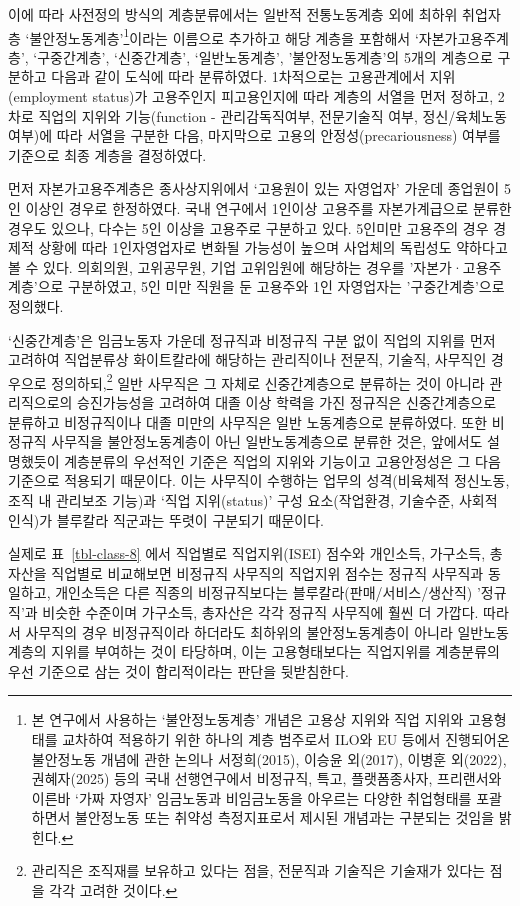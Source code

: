 \documentclass[
  letterpaper,
  DIV=11,
  numbers=noendperiod]{scrartcl}
\begin{document}
이에 따라 사전정의 방식의 계층분류에서는 일반적 전통노동계층 외에 최하위
취업자층 `불안정노동계층'\footnote{본 연구에서 사용하는 `불안정노동계층'
  개념은 고용상 지위와 직업 지위와 고용형태를 교차하여 적용하기 위한
  하나의 계층 범주로서 ILO와 EU 등에서 진행되어온 불안정노동 개념에 관한
  논의나 서정희(2015), 이승윤 외(2017), 이병훈 외(2022), 권혜자(2025)
  등의 국내 선행연구에서 비정규직, 특고, 플랫폼종사자, 프리랜서와 이른바
  `가짜 자영자' 임금노동과 비임금노동을 아우르는 다양한 취업형태를
  포괄하면서 불안정노동 또는 취약성 측정지표로서 제시된 개념과는
  구분되는 것임을 밝힌다.}이라는 이름으로 추가하고 해당 계층을 포함해서
`자본가고용주계층', `구중간계층', `신중간계층', `일반노동계층',
'불안정노동계층'의 5개의 계층으로 구분하고 다음과 같이 도식에 따라
분류하였다. 1차적으로는 고용관계에서 지위(employment status)가
고용주인지 피고용인지에 따라 계층의 서열을 먼저 정하고, 2차로 직업의
지위와 기능(function - 관리감독직여부, 전문기술직 여부, 정신/육체노동
여부)에 따라 서열을 구분한 다음, 마지막으로 고용의
안정성(precariousness) 여부를 기준으로 최종 계층을 결정하였다.

먼저 자본가고용주계층은 종사상지위에서 `고용원이 있는 자영업자' 가운데
종업원이 5인 이상인 경우로 한정하였다. 국내 연구에서 1인이상 고용주를
자본가계급으로 분류한 경우도 있으나, 다수는 5인 이상을 고용주로 구분하고
있다. 5인미만 고용주의 경우 경제적 상황에 따라 1인자영업자로 변화될
가능성이 높으며 사업체의 독립성도 약하다고 볼 수 있다. 의회의원,
고위공무원, 기업 고위임원에 해당하는 경우를 '자본가·고용주계층'으로
구분하였고, 5인 미만 직원을 둔 고용주와 1인 자영업자는 '구중간계층'으로
정의했다.

`신중간계층'은 임금노동자 가운데 정규직과 비정규직 구분 없이 직업의
지위를 먼저 고려하여 직업분류상 화이트칼라에 해당하는 관리직이나 전문직,
기술직, 사무직인 경우으로 정의하되,\footnote{관리직은 조직재를 보유하고
  있다는 점을, 전문직과 기술직은 기술재가 있다는 점을 각각 고려한
  것이다.} 일반 사무직은 그 자체로 신중간계층으로 분류하는 것이 아니라
관리직으로의 승진가능성을 고려하여 대졸 이상 학력을 가진 정규직은
신중간계층으로 분류하고 비정규직이나 대졸 미만의 사무직은 일반
노동계층으로 분류하였다. 또한 비정규직 사무직을 불안정노동계층이 아닌
일반노동계층으로 분류한 것은, 앞에서도 설명했듯이 계층분류의 우선적인
기준은 직업의 지위와 기능이고 고용안정성은 그 다음 기준으로 적용되기
때문이다. 이는 사무직이 수행하는 업무의 성격(비육체적 정신노동, 조직 내
관리보조 기능)과 `직업 지위(status)' 구성 요소(작업환경, 기술수준,
사회적 인식)가 블루칼라 직군과는 뚜렷이 구분되기 때문이다.

실제로 표~\ref{tbl-class-8} 에서 직업별로 직업지위(ISEI) 점수와
개인소득, 가구소득, 총자산을 직업별로 비교해보면 비정규직 사무직의
직업지위 점수는 정규직 사무직과 동일하고, 개인소득은 다른 직종의
비정규직보다는 블루칼라(판매/서비스/생산직) '정규직'과 비슷한 수준이며
가구소득, 총자산은 각각 정규직 사무직에 훨씬 더 가깝다. 따라서 사무직의
경우 비정규직이라 하더라도 최하위의 불안정노동계층이 아니라
일반노동계층의 지위를 부여하는 것이 타당하며, 이는 고용형태보다는
직업지위를 계층분류의 우선 기준으로 삼는 것이 합리적이라는 판단을
뒷받침한다.
\end{document}
